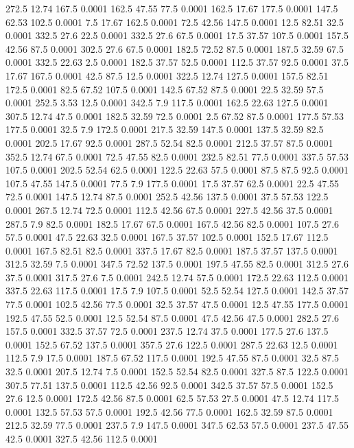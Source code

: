 272.5	12.74	167.5	0.0001
162.5	47.55	77.5	0.0001
162.5	17.67	177.5	0.0001
147.5	62.53	102.5	0.0001
7.5	17.67	162.5	0.0001
72.5	42.56	147.5	0.0001
12.5	82.51	32.5	0.0001
332.5	27.6	22.5	0.0001
332.5	27.6	67.5	0.0001
17.5	37.57	107.5	0.0001
157.5	42.56	87.5	0.0001
302.5	27.6	67.5	0.0001
182.5	72.52	87.5	0.0001
187.5	32.59	67.5	0.0001
332.5	22.63	2.5	0.0001
182.5	37.57	52.5	0.0001
112.5	37.57	92.5	0.0001
37.5	17.67	167.5	0.0001
42.5	87.5	12.5	0.0001
322.5	12.74	127.5	0.0001
157.5	82.51	172.5	0.0001
82.5	67.52	107.5	0.0001
142.5	67.52	87.5	0.0001
22.5	32.59	57.5	0.0001
252.5	3.53	12.5	0.0001
342.5	7.9	117.5	0.0001
162.5	22.63	127.5	0.0001
307.5	12.74	47.5	0.0001
182.5	32.59	72.5	0.0001
2.5	67.52	87.5	0.0001
177.5	57.53	177.5	0.0001
32.5	7.9	172.5	0.0001
217.5	32.59	147.5	0.0001
137.5	32.59	82.5	0.0001
202.5	17.67	92.5	0.0001
287.5	52.54	82.5	0.0001
212.5	37.57	87.5	0.0001
352.5	12.74	67.5	0.0001
72.5	47.55	82.5	0.0001
232.5	82.51	77.5	0.0001
337.5	57.53	107.5	0.0001
202.5	52.54	62.5	0.0001
122.5	22.63	57.5	0.0001
87.5	87.5	92.5	0.0001
107.5	47.55	147.5	0.0001
77.5	7.9	177.5	0.0001
17.5	37.57	62.5	0.0001
22.5	47.55	72.5	0.0001
147.5	12.74	87.5	0.0001
252.5	42.56	137.5	0.0001
37.5	57.53	122.5	0.0001
267.5	12.74	72.5	0.0001
112.5	42.56	67.5	0.0001
227.5	42.56	37.5	0.0001
287.5	7.9	82.5	0.0001
182.5	17.67	67.5	0.0001
167.5	42.56	82.5	0.0001
107.5	27.6	57.5	0.0001
47.5	22.63	32.5	0.0001
167.5	37.57	102.5	0.0001
152.5	17.67	112.5	0.0001
167.5	82.51	82.5	0.0001
337.5	17.67	82.5	0.0001
187.5	37.57	137.5	0.0001
312.5	32.59	7.5	0.0001
347.5	72.52	137.5	0.0001
197.5	47.55	82.5	0.0001
312.5	27.6	37.5	0.0001
317.5	27.6	7.5	0.0001
242.5	12.74	57.5	0.0001
172.5	22.63	112.5	0.0001
337.5	22.63	117.5	0.0001
17.5	7.9	107.5	0.0001
52.5	52.54	127.5	0.0001
142.5	37.57	77.5	0.0001
102.5	42.56	77.5	0.0001
32.5	37.57	47.5	0.0001
12.5	47.55	177.5	0.0001
192.5	47.55	52.5	0.0001
12.5	52.54	87.5	0.0001
47.5	42.56	47.5	0.0001
282.5	27.6	157.5	0.0001
332.5	37.57	72.5	0.0001
237.5	12.74	37.5	0.0001
177.5	27.6	137.5	0.0001
152.5	67.52	137.5	0.0001
357.5	27.6	122.5	0.0001
287.5	22.63	12.5	0.0001
112.5	7.9	17.5	0.0001
187.5	67.52	117.5	0.0001
192.5	47.55	87.5	0.0001
32.5	87.5	32.5	0.0001
207.5	12.74	7.5	0.0001
152.5	52.54	82.5	0.0001
327.5	87.5	122.5	0.0001
307.5	77.51	137.5	0.0001
112.5	42.56	92.5	0.0001
342.5	37.57	57.5	0.0001
152.5	27.6	12.5	0.0001
172.5	42.56	87.5	0.0001
62.5	57.53	27.5	0.0001
47.5	12.74	117.5	0.0001
132.5	57.53	57.5	0.0001
192.5	42.56	77.5	0.0001
162.5	32.59	87.5	0.0001
212.5	32.59	77.5	0.0001
237.5	7.9	147.5	0.0001
347.5	62.53	57.5	0.0001
237.5	47.55	42.5	0.0001
327.5	42.56	112.5	0.0001
